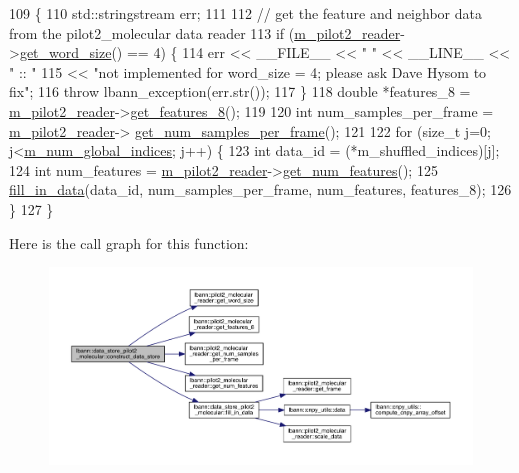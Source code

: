 \begin{DoxyCode}
109                                                        \{
110   std::stringstream err;
111 
112   \textcolor{comment}{// get the feature and neighbor data from the pilot2\_molecular data reader}
113   \textcolor{keywordflow}{if} (\hyperlink{classlbann_1_1data__store__pilot2__molecular_a1875ae12fe7c2b11818ddb3fecff9f72}{m\_pilot2\_reader}->\hyperlink{classlbann_1_1pilot2__molecular__reader_abba5a68c484be69a441e5e9711356a46}{get\_word\_size}() == 4) \{
114     err << \_\_FILE\_\_ << \textcolor{stringliteral}{" "} << \_\_LINE\_\_ << \textcolor{stringliteral}{" :: "}
115         << \textcolor{stringliteral}{"not implemented for word\_size = 4; please ask Dave Hysom to fix"};
116     \textcolor{keywordflow}{throw} lbann\_exception(err.str());
117   \}
118   \textcolor{keywordtype}{double} *features\_8 = \hyperlink{classlbann_1_1data__store__pilot2__molecular_a1875ae12fe7c2b11818ddb3fecff9f72}{m\_pilot2\_reader}->\hyperlink{classlbann_1_1pilot2__molecular__reader_a6694fec3678fd8a883d5d8de6c2c74d5}{get\_features\_8}();
119 
120   \textcolor{keywordtype}{int} num\_samples\_per\_frame = \hyperlink{classlbann_1_1data__store__pilot2__molecular_a1875ae12fe7c2b11818ddb3fecff9f72}{m\_pilot2\_reader}->
      \hyperlink{classlbann_1_1pilot2__molecular__reader_a91e233f9878e93e31de2085cbcad1f10}{get\_num\_samples\_per\_frame}();
121   
122   \textcolor{keywordflow}{for} (\textcolor{keywordtype}{size\_t} j=0; j<\hyperlink{classlbann_1_1generic__data__store_a0dfa2ffa01845b84ca477fb3e14a36c6}{m\_num\_global\_indices}; j++) \{
123     \textcolor{keywordtype}{int} data\_id = (*m\_shuffled\_indices)[j];
124     \textcolor{keywordtype}{int} num\_features = \hyperlink{classlbann_1_1data__store__pilot2__molecular_a1875ae12fe7c2b11818ddb3fecff9f72}{m\_pilot2\_reader}->\hyperlink{classlbann_1_1pilot2__molecular__reader_ad4fcb0da3f6964cbe24de4feac3f5f4a}{get\_num\_features}();
125     \hyperlink{classlbann_1_1data__store__pilot2__molecular_a0157fe4d04961c03c0d983cb43aa1cec}{fill\_in\_data}(data\_id, num\_samples\_per\_frame, num\_features, features\_8);
126   \}
127 \}
\end{DoxyCode}
Here is the call graph for this function\+:\nopagebreak
\begin{figure}[H]
\begin{center}
\leavevmode
\includegraphics[width=350pt]{classlbann_1_1data__store__pilot2__molecular_a8021fa0a93e39c9d43de6ecc2d72e14e_cgraph}
\end{center}
\end{figure}
